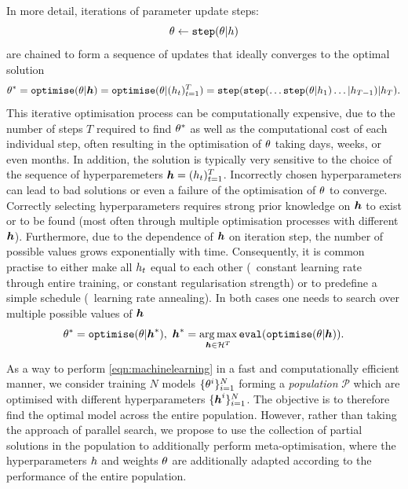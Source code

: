 In more detail, iterations of parameter update steps:
\begin{equation}
\theta \leftarrow \mathtt{step}(\theta | h)
\label{eqn:step}
\end{equation}
are chained to form a sequence of updates that ideally converges to the optimal solution
\begin{equation}
\theta^* =  \mathtt{optimise}(\theta | \boldsymbol{h} ) = \mathtt{optimise}(\theta | (h_t )_{t=1}^T) = \mathtt{step}(\mathtt{step}(\ldots\mathtt{step}(\theta | h_1)\ldots | h_{T-1})| h_T).
\end{equation}
This iterative optimisation process can be computationally expensive, due to the number of steps $T$ required to find $\theta^*$ as well as the computational cost of each individual step, often resulting in the optimisation of $\theta$ taking days, weeks, or even months. In addition, the solution is typically very sensitive to the choice of the sequence of hyperparemeters $\boldsymbol{h} = (h_t )_{t=1}^T$. 
Incorrectly chosen hyperparameters can lead to bad solutions or even a failure of the optimisation of $\theta$ to converge.
Correctly selecting hyperparameters requires strong prior knowledge on $\boldsymbol{h}$ to exist or to be found (most often through multiple optimisation processes with different $\boldsymbol{h}$).
Furthermore, due to the dependence of $\boldsymbol{h}$ on iteration step, the number of possible values grows exponentially with time. Consequently, it is common practise to either make all $h_t$ equal to each other (\eg~constant learning rate through entire training, or constant regularisation strength) or to predefine a simple schedule (\eg~learning rate annealing). 
In both cases one needs to search over multiple possible values of $\boldsymbol{h}$
\begin{equation}
\theta^* = \mathtt{optimise}(\theta | \boldsymbol{h}^*), ~\boldsymbol{h}^* = \operatorname*{arg\,max}_{\boldsymbol{h} \in \mathcal{H}^T} \mathtt{eval}(\mathtt{optimise}(\theta | \boldsymbol{h})).
\label{eqn:machinelearning}
\end{equation}


As a way to perform \eqref{eqn:machinelearning} in a fast and computationally efficient manner, we consider training $N$ models $\{\theta^{i}\}_{i=1}^N$ forming a \emph{population} $\mathcal{P}$ which are optimised with different hyperparameters $\{\boldsymbol{h}^{i}\}_{i=1}^N$. The objective is to therefore find the optimal model across the entire population. However, rather than taking the approach of parallel search, we propose to use the collection of partial solutions in the population to additionally perform meta-optimisation, where the hyperparameters $h$ and weights $\theta$ are additionally adapted according to the performance of the entire population. 

